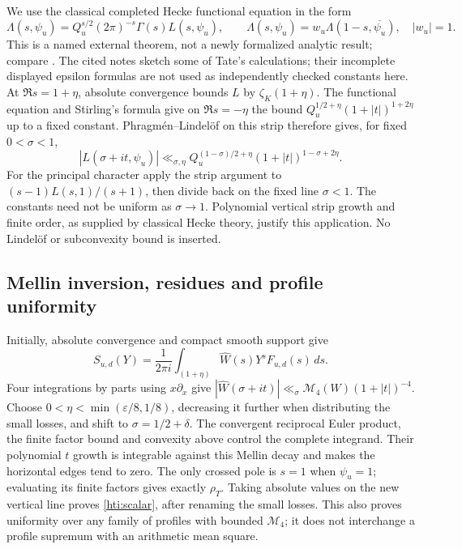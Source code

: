\documentclass[11pt,oneside,openany]{book}
\theoremstyle{definition}\newtheorem{definition}[theorem]{Definition}
\theoremstyle{remark}\newtheorem{remark}[theorem]{Remark}
\begin{document}
We use the classical completed Hecke functional equation in the form
\[
 \Lambda(s,\psi_u)=Q_u^{s/2}(2\pi)^{-s}\Gamma(s)L(s,\psi_u),
 \qquad\Lambda(s,\psi_u)=w_u\Lambda(1-s,\overline{\psi_u}),
 \quad |w_u|=1.
\]
This is a named external theorem, not a newly formalized analytic result;
compare \cite[Theorem~4.3, Corollary~4.4]{KudlaTateTypeI}. The cited notes
sketch some of Tate's calculations; their incomplete displayed epsilon
formulas are not used as independently checked constants here.
At $\Re s=1+\eta$, absolute convergence bounds $L$ by $\zeta_K(1+\eta)$.
The functional equation and Stirling's formula give on $\Re s=-\eta$
the bound $Q_u^{1/2+\eta}(1+|t|)^{1+2\eta}$ up to a fixed constant.
Phragm\'en--Lindel\"of on this strip therefore gives, for fixed
$0<\sigma<1$,
\[
 |L(\sigma+it,\psi_u)|
 \ll_{\sigma,\eta}Q_u^{(1-\sigma)/2+\eta}
                      (1+|t|)^{1-\sigma+2\eta}.
\]
For the principal character apply the strip argument to
$(s-1)L(s,1)/(s+1)$, then divide back on the fixed line $\sigma<1$.
The constants need not be uniform as $\sigma\to1$. Polynomial vertical
strip growth and finite order, as supplied by classical Hecke theory,
justify this application. No Lindel\"of or subconvexity bound is inserted.

\subsection{Mellin inversion, residues and profile uniformity}
Initially, absolute convergence and compact smooth support give
\[
 S_{u,d}(Y)=\frac1{2\pi i}\int_{(1+\eta)}
       \widehat W(s)Y^sF_{u,d}(s)\,ds.
\]
Four integrations by parts using $x\partial_x$ give
$|\widehat W(\sigma+it)|\ll_\sigma\mathcal M_4(W)(1+|t|)^{-4}$.
Choose $0<\eta<\min(\varepsilon/8,1/8)$, decreasing it further
when distributing the small losses, and shift to
$\sigma=1/2+\delta$. The convergent reciprocal Euler product, the finite
factor bound and convexity above control the complete integrand.
Their polynomial $t$ growth is integrable against this Mellin decay and
makes the horizontal edges tend to zero. The only crossed pole is $s=1$
when $\psi_u=1$; evaluating its finite factors gives exactly $\rho_T$.
Taking absolute values on the new vertical line proves
\eqref{hti:scalar}, after renaming the small losses. This also proves
uniformity over any family of profiles with bounded $\mathcal M_4$;
it does not interchange a profile supremum with an arithmetic mean square.
\end{document}
